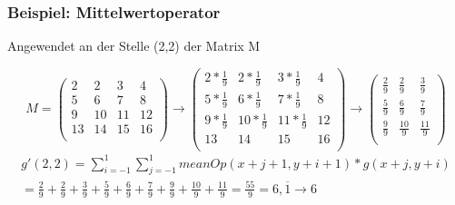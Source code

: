 \documentclass[aspectratio=169]{beamer}
\begin{document}
\begin{frame}
    \frametitle{Beispiel: Mittelwertoperator}
    \begin{alertblock}
        {Angewendet an der Stelle (2,2) der Matrix M}
    \begin{center}
        \begin{equation} M =
            \begin{pmatrix}
                 2 &  2 &  3 &  4\\
                 5 &  6 &  7 &  8\\
                 9 & 10 & 11 & 12\\
                13 & 14 & 15 & 16\\
            \end{pmatrix}
            \rightarrow 
            \begin{pmatrix}
                2*\frac{1}{9} &  2*\frac{1}{9} &  3*\frac{1}{9} &  4\\
                 5*\frac{1}{9} &  6*\frac{1}{9} &  7*\frac{1}{9} &  8\\
                 9*\frac{1}{9} & 10*\frac{1}{9} & 11*\frac{1}{9} & 12\\
                13 & 14 & 15 & 16\\
            \end{pmatrix}
            \rightarrow
            \begin{pmatrix}
                \frac{2}{9} &  \frac{2}{9} &  \frac{3}{9}\\
                \frac{5}{9} &  \frac{6}{9} &  \frac{7}{9}\\
                 \frac{9}{9} & \frac{10}{9} & \frac{11}{9}\\
            \end{pmatrix}
        \end{equation}
        \begin{equation}
        \begin{aligned}
            g'(2,2) =\sum_{i=-1}^{1}\sum_{j=-1}^{1}meanOp(x+j+1,y+i+1)*g(x+j,y+i) \\
            = \frac{2}{9} + \frac{2}{9} + \frac{3}{9} + \frac{5}{9} + \frac{6}{9} + \frac{7}{9} + \frac{9}{9} + \frac{10}{9} + \frac{11}{9} = \frac{55}{9} = 6,\overline{1} \rightarrow 6
        \end{aligned}
        \end{equation}
    \end{center}
    \end{alertblock}
\end{frame}
\end{document}
